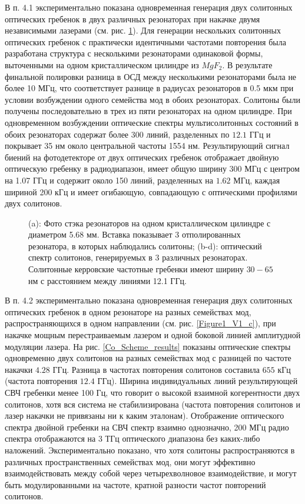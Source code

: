В п. 4.1 экспериментально показана одновременная генерация двух солитонных оптических гребенок в двух различных резонаторах при накачке двумя независимыми лазерами (см. рис. \ref{ris:image1}). Для генерации нескольких солитонных оптических гребенок с практически идентичными частотами повторения была разработана структура с несколькими резонаторами одинаковой формы, выточенными на одном кристаллическом цилиндре из $MgF_2$. В результате финальной полировки разница в ОСД между несколькими резонаторами была не более 10 МГц, что соответствует разнице в радиусах резонаторов в 0.5 мкм при условии возбуждении одного семейства мод в обоих резонаторах. Солитоны были получены последовательно в трех из пяти резонаторах на одном цилиндре. При одновременном возбуждении оптические спектры мультисолитонных состояний в обоих резонаторах содержат более 300 линий, разделенных по $12.1$ ГГц и покрывает 35 нм около центральной частоты 1554 нм. Результирующий сигнал биений на фотодетекторе от двух оптических гребенок отображает двойную оптическую гребенку в радиодиапазон, имеет общую ширину 300 МГц с центром на 1.07 ГГц и содержит около 150 линий, разделенных на $1.62$ МГц, каждая шириной 200 кГц и имеет огибающую, совпадающую с оптическими профилями двух солитонов.

\begin{figure}[!htb]
\begin{minipage}{1\linewidth}
\end{minipage}
\caption{(a): Фото стэка резонаторов на одном кристаллическом цилиндре с диаметром 5.68 мм. Вставка показывает 3 отполированных резонатора, в которых наблюдались солитоны; (b-d): оптический спектр солитонов, генерируемых в 3 различных резонаторах. Солитонные керровские частотные гребенки имеют ширину $30 - 65$ нм с расстоянием между линиями 12.1 ГГц.}
\label{ris:image1}
\end{figure}

В п. 4.2 экспериментально показана одновременная генерация двух солитонных оптических гребенок в одном резонаторе на разных семействах мод, распространяющихся в одном направлении (см. рис. \ref{Figure1_V1_c}), при накачке мощным перестраиваемым лазером и одной боковой линией амплитудной модуляции лазера. На рис. \ref{Co_Scheme_results} показаны оптические спектры одновременно двух солитонов на разных семействах мод с разницей по частоте накачки $4.28$ ГГц. Разница в частотах повторения солитонов составила $655$ кГц (частота повторения $12.4$ ГГц). Ширина индивидуальных линий результирующей СВЧ гребенки менее 100 Гц, что говорит о высокой взаимной когерентности двух солитонов, хотя вся система не стабилизирована (частота повторения солитонов и лазер накачки не привязаны ни к каким эталонам). Отображение оптического спектра двойной гребенки на СВЧ спектр взаимно однозначно, 200 МГц радио спектра отображаются на 3 ТГц оптического диапазона без каких-либо наложений. Экспериментально показано, что хотя солитоны распространяются в различных пространственных семействах мод, они могут эффективно взаимодействовать между собой через четырехволновое взаимодействие, и могут быть модулированными на частоте, кратной разности частот повторений солитонов.

